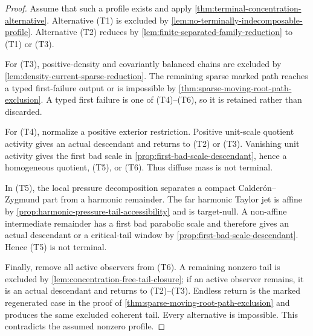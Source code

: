 \documentclass[11pt]{amsart}
\numberwithin{equation}{section}
\theoremstyle{plain}
\theoremstyle{definition}
\theoremstyle{remark}
\begin{document}
\begin{proof}
Assume that such a profile exists and apply
\cref{thm:terminal-concentration-alternative}.  Alternative \textup{(T1)} is
excluded by \cref{lem:no-terminally-indecomposable-profile}.  Alternative
\textup{(T2)} reduces by
\cref{lem:finite-separated-family-reduction} to \textup{(T1)} or
\textup{(T3)}.

For \textup{(T3)}, positive-density and covariantly balanced chains are
excluded by \cref{lem:density-current-sparse-reduction}.  The remaining sparse
marked path reaches a typed first-failure output or is impossible by
\cref{thm:sparse-moving-root-path-exclusion}.  A typed first failure is one of
\textup{(T4)}--\textup{(T6)}, so it is retained rather than discarded.

For \textup{(T4)}, normalize a positive exterior restriction.  Positive
unit-scale quotient activity gives an actual descendant and returns to
\textup{(T2)} or \textup{(T3)}.  Vanishing unit activity gives the first bad
scale in \cref{prop:first-bad-scale-descendant}, hence a homogeneous quotient,
\textup{(T5)}, or \textup{(T6)}.  Thus diffuse mass is not terminal.

In \textup{(T5)}, the local pressure decomposition separates a compact
Calder\'on--Zygmund part from a harmonic remainder.  The far harmonic Taylor
jet is affine by \cref{prop:harmonic-pressure-tail-accessibility} and is
target-null.  A non-affine intermediate remainder has a first bad parabolic
scale and therefore gives an actual descendant or a critical-tail window by
\cref{prop:first-bad-scale-descendant}.  Hence \textup{(T5)} is not terminal.

Finally, remove all active observers from \textup{(T6)}.  A remaining nonzero
tail is excluded by \cref{lem:concentration-free-tail-closure}; if an active
observer remains, it is an actual descendant and returns to
\textup{(T2)}--\textup{(T3)}.  Endless return is the marked regenerated case
in the proof of \cref{thm:sparse-moving-root-path-exclusion} and produces the
same excluded coherent tail.  Every alternative is impossible.  This
contradicts the assumed nonzero profile.
\end{proof}
\end{document}
